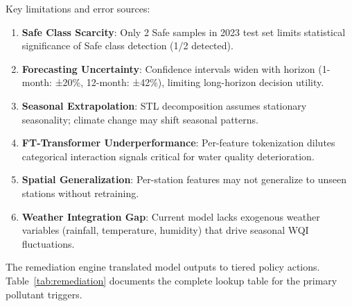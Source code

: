 \documentclass[12pt,a4paper]{report}
\numberwithin{table}{chapter}
\numberwithin{figure}{chapter}
\begin{document}
Key limitations and error sources:
\begin{enumerate}
  \item \textbf{Safe Class Scarcity}: Only 2 Safe samples in 2023 test set limits
    statistical significance of Safe class detection (1/2 detected).
  \item \textbf{Forecasting Uncertainty}: Confidence intervals widen with horizon
    (1-month: ±20\%, 12-month: ±42\%), limiting long-horizon decision utility.
  \item \textbf{Seasonal Extrapolation}: STL decomposition assumes stationary
    seasonality; climate change may shift seasonal patterns.
  \item \textbf{FT-Transformer Underperformance}: Per-feature tokenization dilutes
    categorical interaction signals critical for water quality deterioration.
  \item \textbf{Spatial Generalization}: Per-station features may not generalize to
    unseen stations without retraining.
  \item \textbf{Weather Integration Gap}: Current model lacks exogenous weather
    variables (rainfall, temperature, humidity) that drive seasonal WQI fluctuations.
\end{enumerate}

The remediation engine translated model outputs to tiered policy actions. Table~\ref{tab:remediation}
documents the complete lookup table for the primary pollutant triggers.
\end{document}
